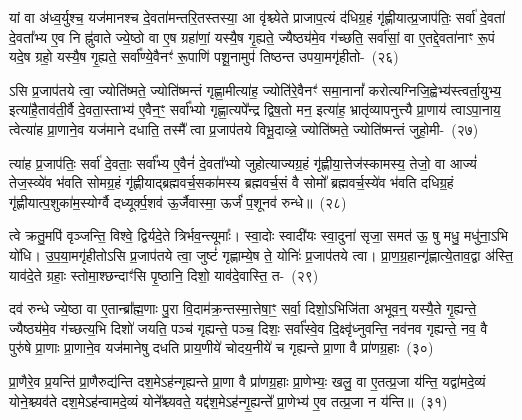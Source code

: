 {\anuvakamend[{ओष॑धीभ्य॒श्चतु॑र्दश च}]}

यां वा अ॑ध्व॒र्युश्च॒ यज॑मानश्च दे॒वता॑मन्तरि॒तस्तस्या॒ आ वृ॑श्च्येते प्राजाप॒त्यं द॑धिग्र॒हं गृ॑ह्णीयात्प्र॒जा\-प॑तिः॒ सर्वा॑ दे॒वता॑ दे॒वता᳚भ्य ए॒व नि ह्नु॑वाते ज्ये॒ष्ठो वा ए॒ष ग्रहा॑णां॒ यस्यै॒ष गृ॒ह्यते॒ ज्यैष्ठ्य॑मे॒व ग॑च्छति॒ सर्वा॑सां॒ वा ए॒तद्दे॒वता॑नाꣳ रू॒पं यदे॒ष ग्रहो॒ यस्यै॒ष गृ॒ह्यते॒ सर्वा᳚ण्ये॒वैनꣳ॑ रू॒पाणि॑ पशू॒नामुप॑ तिष्ठन्त उपया॒मगृ॑हीतो-~(२६)\ip

ऽसि प्र॒जा\-प॑तये त्वा॒ ज्योति॑ष्मते॒ ज्योति॑ष्मन्तं गृह्णा॒मीत्या॑ह॒ ज्योति॑रे॒वैनꣳ॑ समा॒नानां᳚ करोत्यग्निजि॒ह्वेभ्य॑स्त्वर्ता॒युभ्य॒ इत्या॑है॒ताव॑ती॒र्वै दे॒वता॒स्ताभ्य॑ ए॒वैन॒ꣳ॒ सर्वा᳚भ्यो गृह्णा॒त्यपे᳚न्द्र द्विष॒तो मन॒ इत्या॑ह॒ भ्रातृ॑व्यापनुत्त्यै प्रा॒णाय॑ त्वाऽपा॒नाय॒ त्वेत्या॑ह प्रा॒णाने॒व यज॑माने दधाति॒ तस्मै᳚ त्वा प्र॒जा\-प॑तये विभू॒दाव्न्ने॒ ज्योति॑ष्मते॒ ज्योति॑ष्मन्तं जुहो॒मी-~(२७)\ip

त्या॑ह प्र॒जा\-प॑तिः॒ सर्वा॑ दे॒वताः॒ सर्वा᳚भ्य ए॒वैनं॑ दे॒वता᳚भ्यो जुहोत्याज्यग्र॒हं गृ॑ह्णीया॒त्तेज॑स्कामस्य॒ तेजो॒ वा आज्यं॑ तेज॒स्व्ये॑व भ॑वति सोमग्र॒हं गृ॑ह्णीयाद्ब्रह्मवर्च॒सका॑मस्य ब्रह्मवर्च॒सं वै सोमो᳚ ब्रह्मवर्च॒स्ये॑व भ॑वति दधिग्र॒हं गृ॑ह्णीयात्प॒शुका॑म॒स्योर्ग्वै दध्यूर्क्प॒शव॑ ऊ॒र्जैवास्मा॒ ऊर्जं॑ प॒शूनव॑ रुन्धे॥~(२८)\ip

{\anuvakamend[{उ॒प॒या॒मगृ॑हीतो जुहोमि॒ त्रिच॑त्वारिꣳशच्च}]}

त्वे क्रतु॒मपि॑ वृञ्जन्ति॒ विश्वे॒ द्विर्यदे॒ते त्रिर्भव॒न्त्यूमाः᳚। स्वा॒दोः स्वादी॑यः स्वा॒दुना॑ सृजा॒ समत॑ ऊ॒ षु मधु॒ मधु॑ना॒ऽभि यो॑धि। उ॒प॒या॒मगृ॑हीतो\-ऽसि प्र॒जा\-प॑तये त्वा॒ जुष्टं॑ गृह्णाम्ये॒ष ते॒ योनिः॑ प्र॒जा\-प॑तये त्वा। प्रा॒ण॒ग्र॒हान्गृ॑ह्णात्ये॒ताव॒द्वा अ॑स्ति॒ याव॑दे॒ते ग्रहाः॒ स्तोमा॒श्छन्दाꣳ॑सि पृ॒ष्ठानि॒ दिशो॒ याव॑दे॒वास्ति॒ त-~(२९)\ip

दव॑ रुन्धे ज्ये॒ष्ठा वा ए॒तान्ब्रा᳚ह्म॒णाः पु॒रा वि॒दाम॑क्र॒न्तस्मा॒त्तेषा॒ꣳ॒ सर्वा॒ दिशो॒\-ऽभिजि॑ता अभूव॒न्॒ यस्यै॒ते गृ॒ह्यन्ते॒ ज्यैष्ठ्य॑मे॒व ग॑च्छत्य॒भि दिशो॑ जयति॒ पञ्च॑ गृह्यन्ते॒ पञ्च॒ दिशः॒ सर्वा᳚स्वे॒व दि॒क्ष्वृ॑ध्नुवन्ति॒ नव॑नव गृह्यन्ते॒ नव॒ वै पुरु॑षे प्रा॒णाः प्रा॒णाने॒व यज॑मानेषु दधति प्राय॒णीये॑ चोदय॒नीये॑ च गृह्यन्ते प्रा॒णा वै प्रा॑णग्र॒हाः~(३०)\ip

प्रा॒णैरे॒व प्र॒यन्ति॑ प्रा॒णैरुद्य॑न्ति दश॒मे\-ऽह॑न्गृह्यन्ते प्रा॒णा वै प्रा॑णग्र॒हाः प्रा॒णेभ्यः॒ खलु॒ वा ए॒तत्प्र॒जा य॑न्ति॒ यद्वा॑मदे॒व्यं योने॒श्च्यव॑ते दश॒मे\-ऽह॑न्वामदे॒व्यं योने᳚श्च्यवते॒ यद्द॑श॒मे\-ऽह॑न्गृ॒ह्यन्ते᳚ प्रा॒णेभ्य॑ ए॒व तत्प्र॒जा न य॑न्ति॥~(३१)\ip

{\anuvakamend[{तत्प्रा॑णग्र॒हाः स॒प्तत्रिꣳ॑शच्च}]}%

